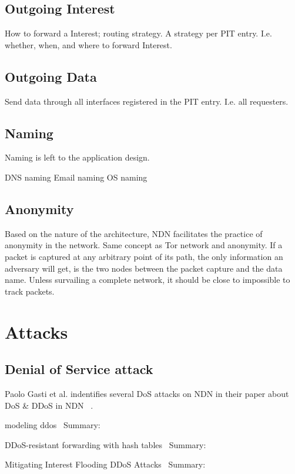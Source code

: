 \subsection{Outgoing Interest}
How to forward a Interest; routing strategy. A strategy per \gls{PIT} entry. I.e. whether, when, and where to forward Interest.

\subsection{Outgoing Data}
Send data through all interfaces registered in the \gls{PIT} entry. I.e. all requesters.

\subsection{Naming}
Naming is left to the application design.

\gls{DNS} naming
Email naming
\gls{OS} naming

\subsection{Anonymity}
Based on the nature of the architecture, \gls{NDN} facilitates the practice of anonymity in the network. 
Same concept as Tor network and anonymity.
If a packet is captured at any arbitrary point of its path, the only information an adversary will get, is the two nodes between the packet capture and the data name. Unless survailing a complete network, it should be close to impossible to track packets.  


\section{Attacks}

\subsection{Denial of Service attack}
Paolo Gasti et al. indentifies several \gls{DoS} attacks on \gls{NDN} in their paper about \gls{DoS} \& \gls{DDoS} in \gls{NDN} ~\cite{DBLP:conf/icccn/GastiTU013}. 


modeling ddos~\cite{DBLP:journals/ijcomsys/WangCZQZ14}
Summary:


DDoS-resistant forwarding with hash tables~\cite{DBLP:conf/ancs/SoNO13}
Summary:


Mitigating Interest Flooding DDoS Attacks~\cite{DBLP:journals/corr/abs-1303-4823}
Summary:

